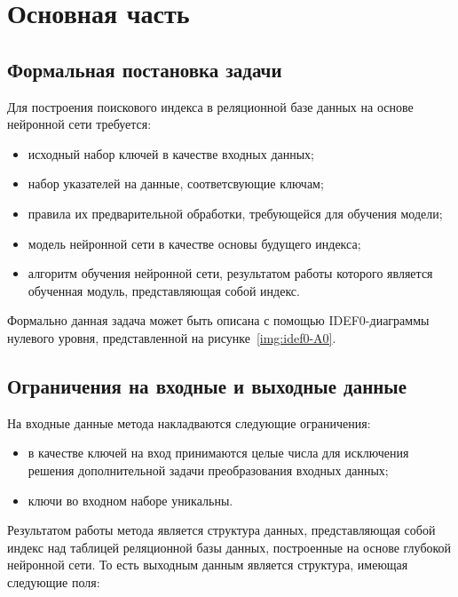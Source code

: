 \chapter{Основная часть}

\section{Формальная постановка задачи}

Для построения поискового индекса в реляционной базе данных на основе нейронной
сети требуется:

\begin{itemize}
    \item исходный набор ключей в качестве входных данных;
    \item набор указателей на данные, соответсвующие ключам;
    \item правила их предварительной обработки, требующейся для обучения модели;
    \item модель нейронной сети в качестве основы будущего индекса;
    \item алгоритм обучения нейронной сети, результатом работы которого является
        обученная модуль, представляющая собой индекс.
\end{itemize}

Формально данная задача может быть описана с помощью IDEF0-диаграммы нулевого
уровня, представленной на рисунке~\ref{img:idef0-A0}.


\section{Ограничения на входные и выходные данные}

На входные данные метода накладваются следующие ограничения:

\begin{itemize}
    \item в качестве ключей на вход принимаются целые числа для исключения
        решения дополнительной задачи преобразования входных данных;
    \item ключи во входном наборе уникальны.
\end{itemize}

Результатом работы метода является структура данных, представляющая собой индекс
над таблицей реляционной базы данных, построенные на основе глубокой нейронной
сети. То есть выходным данным является структура, имеющая следующие поля:

